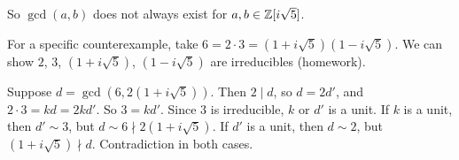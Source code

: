 \documentclass[12pt,letterpaper]{report}
\begin{document}
So $\gcd(a, b)$ does not always exist for $a, b \in \mathbb{Z}[i\sqrt{5}]$.

For a specific counterexample, take $6 = 2 \cdot 3 = (1 + i\sqrt{5})(1 - i\sqrt{5})$.
We can show $2$, $3$, $(1 + i\sqrt{5})$, $(1 - i\sqrt{5})$ are irreducibles (homework).

Suppose $d = \gcd(6, 2(1 + i\sqrt{5}))$.
Then $2 \mid d$, so $d = 2d'$, and $2 \cdot 3 = kd = 2kd'$.
So $3 = kd'$.
Since $3$ is irreducible, $k$ or $d'$ is a unit.
If $k$ is a unit, then $d' \sim 3$, but $d \sim 6 \nmid 2(1 + i\sqrt{5})$.
If $d'$ is a unit, then $d \sim 2$, but $(1 + i\sqrt{5}) \nmid d$.
Contradiction in both cases.

\end{document}
